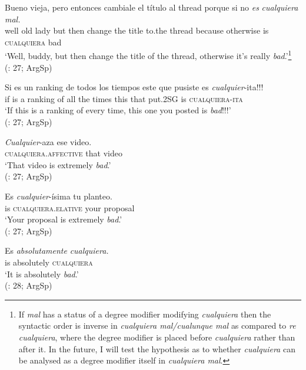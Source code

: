 \largerpage[2]
\ea \label{ex:key:62} %
  \gll Bueno vieja, pero entonces cambiale el título al thread porque {si no} \textit{es} \textit{cualquiera} \textit{mal.}\\
  well {old lady} but then change the title to.the thread because otherwise is \textsc{cualquiera} bad\\
  \glt ‘Well, buddy, but then change the title of the thread, otherwise it’s really \textit{bad}.’\footnote{{If} {\textit{mal}} {has a status of a degree modifier modifying} {\textit{cualquiera}} {then the syntactic order is inverse in} {\textit{cualquiera mal/cualunque mal}} {as compared to} {\textit{re cualquiera}}{, where the degree modifier is placed before} {\textit{cualquiera}} {rather than after it. In the future, I will test the hypothesis as to whether} {\textit{cualquiera}} {can be analysed as a degree modifier itself in} {\textit{cualquiera mal}}.} \\
  (\citealt{Rizzosalierno2013}: 27; ArgSp)
\z\clearpage

\ea \label{ex:key:63} %
  \gll Si es un ranking de todos los tiempos este que pusiste es \textit{cualquier}{-ita}!!!\\
  if is a ranking of all the times this that put.2SG is \textsc{cualquiera}\textsc{-ita}\\
  \glt ‘If this is a ranking of every time, this one you posted is \textit{bad}!!!’\\
  (\citealt{Rizzosalierno2013}: 27; ArgSp)
\z 

\ea \label{ex:key:64} %
  \gll \textit{Cualquier}-aza ese video.\\
  \textsc{cualquiera.affective} that video\\
  \glt ‘That video is extremely \textit{bad}.’\\
  (\citealt{Rizzosalierno2013}: 27; ArgSp)
 \z  

\ea \label{ex:key:65} %
  \gll Es \textit{cualquier}-ísima tu planteo.\\
  is \textsc{cualquiera.elative} your proposal\\
  \glt ‘Your proposal is extremely \textit{bad}.’\\
  (\citealt{Rizzosalierno2013}: 27; ArgSp)
\z 

\ea \label{ex:key:66} %
  \gll Es \textit{absolutamente} \textit{cualquiera.}\\
  is absolutely \textsc{cualquiera}\\
  \glt ‘It is absolutely \textit{bad}.’\\
  (\citealt{Rizzosalierno2013}: 28; ArgSp)
\z 

